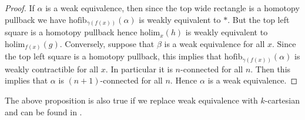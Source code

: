 \begin{prp}
\begin{proof}
If $\alpha$ is a weak equivalence, then since the top wide rectangle is a homotopy pullback we have $\text{hofib}_{\gamma(f(x))}(\alpha)$ is weakly equivalent to $\ast$. But the top left square is a homotopy pullback hence $\text{holim}_x(h)$ is weakly equivalent to $\text{holim}_{f(x)}(g)$. Conversely, suppose that $\beta$ is a weak equivalence for all $x$. Since the top left square is a homotopy pullback, this implies that $\text{hofib}_{\gamma(f(x))}(\alpha)$ is weakly contractible for all $x$. In particular it is $n$-connected for all $n$. Then this implies that $\alpha$ is $(n+1)$-connected for all $n$. Hence $\alpha$ is a weak equivalence. 
\end{proof}
\end{prp}

The above proposition is also true if we replace weak equivalence with $k$-cartesian and can be found in \cite{CHT}. 

